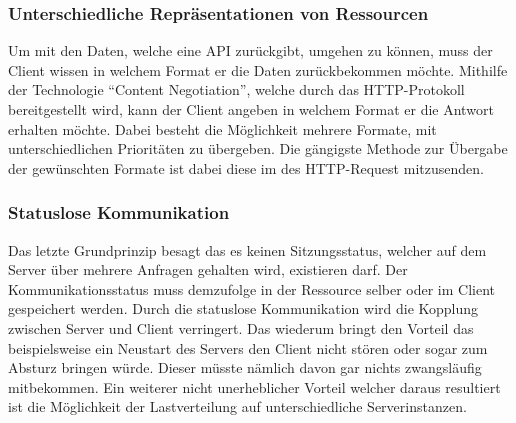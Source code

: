 \subsubsection{Unterschiedliche Repräsentationen von Ressourcen}
Um mit den Daten, welche eine \gls{API} zurückgibt, umgehen zu können, muss der Client wissen in welchem Format er die Daten zurückbekommen möchte. Mithilfe der Technologie \enquote{Content Negotiation}, welche durch das \gls{HTTP}-Protokoll bereitgestellt wird, kann der Client angeben in welchem Format er die Antwort erhalten möchte. Dabei besteht die Möglichkeit mehrere Formate, mit unterschiedlichen Prioritäten zu übergeben. Die gängigste Methode zur Übergabe der gewünschten Formate ist dabei diese im  des \gls{HTTP}-Request mitzusenden.

\subsubsection{Statuslose Kommunikation}\label{sec:statelessCommunikation}
Das letzte Grundprinzip besagt das es keinen Sitzungsstatus, welcher auf dem Server über mehrere Anfragen gehalten wird, existieren darf. Der Kommunikationsstatus muss demzufolge in der Ressource selber oder im Client gespeichert werden. Durch die statuslose Kommunikation wird die Kopplung zwischen Server und Client verringert. Das wiederum bringt den Vorteil das beispielsweise ein Neustart des Servers den Client nicht stören oder sogar zum Absturz bringen würde. Dieser müsste nämlich davon gar nichts zwangsläufig mitbekommen. Ein weiterer nicht unerheblicher Vorteil welcher daraus resultiert ist die Möglichkeit der Lastverteilung auf unterschiedliche Serverinstanzen.

